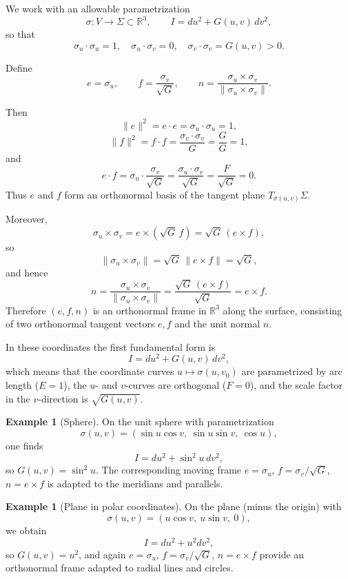 \documentclass[12pt,a4paper]{article}
\theoremstyle{plain}
\theoremstyle{definition}      %
\newtheorem{example}[theorem]{Example}
\begin{document}
\medskip

We work with an allowable parametrization
\[
\sigma:V\to\Sigma\subset\mathbb{R}^3,\qquad
I = du^{2} + G(u,v)\,dv^{2},
\]
so that
\[
\sigma_{u}\cdot\sigma_{u} = 1,\quad
\sigma_{u}\cdot\sigma_{v} = 0,\quad
\sigma_{v}\cdot\sigma_{v} = G(u,v)>0.
\]

Define
\[
e = \sigma_{u},\qquad
f = \frac{\sigma_{v}}{\sqrt{G}},\qquad
n = \frac{\sigma_{u}\times\sigma_{v}}
{\|\sigma_{u}\times\sigma_{v}\|}.
\]

Then
\[
\|e\|^{2} = e\cdot e = \sigma_{u}\cdot\sigma_{u} = 1,
\]
\[
\|f\|^{2}
= f\cdot f
= \frac{\sigma_{v}\cdot\sigma_{v}}{G}
= \frac{G}{G} = 1,
\]
and
\[
e\cdot f
= \sigma_{u}\cdot\frac{\sigma_{v}}{\sqrt{G}}
= \frac{\sigma_{u}\cdot\sigma_{v}}{\sqrt{G}}
= \frac{F}{\sqrt{G}} = 0.
\]
Thus $e$ and $f$ form an orthonormal basis of the tangent plane
$T_{\sigma(u,v)}\Sigma$.

Moreover,
\[
\sigma_{u}\times\sigma_{v}
= e\times(\sqrt{G}\,f)
= \sqrt{G}\,(e\times f),
\]
so
\[
\|\sigma_{u}\times\sigma_{v}\|
= \sqrt{G}\,\|e\times f\|
= \sqrt{G},
\]
and hence
\[
n
= \frac{\sigma_{u}\times\sigma_{v}}{\|\sigma_{u}\times\sigma_{v}\|}
= \frac{\sqrt{G}\,(e\times f)}{\sqrt{G}}
= e\times f.
\]
Therefore $(e,f,n)$ is an orthonormal frame in $\mathbb{R}^{3}$ along the
surface, consisting of two orthonormal tangent vectors $e,f$ and the unit
normal $n$.

In these coordinates the first fundamental form is
\[
I = du^{2} + G(u,v)\,dv^{2},
\]
which means that the coordinate curves $u\mapsto\sigma(u,v_{0})$ are
parametrized by arc length ($E=1$), the $u$- and $v$-curves are orthogonal
($F=0$), and the scale factor in the $v$-direction is $\sqrt{G(u,v)}$.

\begin{example}[Sphere]
	On the unit sphere with parametrization
	\[
	\sigma(u,v) = (\sin u\cos v,\ \sin u\sin v,\ \cos u),
	\]
	one finds
	\[
	I = du^{2} + \sin^{2}u\,dv^{2},
	\]
	so $G(u,v)=\sin^{2}u$.  The corresponding moving frame
	$e=\sigma_{u}$, $f=\sigma_{v}/\sqrt{G}$, $n=e\times f$ is adapted to the
	meridians and parallels.
\end{example}

\begin{example}[Plane in polar coordinates]
	On the plane (minus the origin) with
	\[
	\sigma(u,v) = (u\cos v,\ u\sin v,\ 0),
	\]
	we obtain
	\[
	I = du^{2} + u^{2}dv^{2},
	\]
	so $G(u,v)=u^{2}$, and again $e=\sigma_{u}$, $f=\sigma_{v}/\sqrt{G}$,
	$n=e\times f$ provide an orthonormal frame adapted to radial lines and circles.
\end{example}
\end{document}
